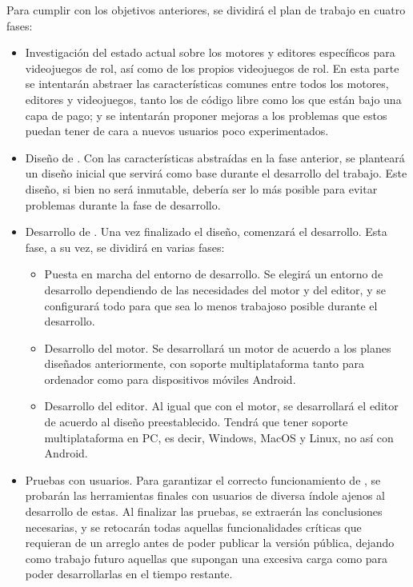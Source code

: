 Para cumplir con los objetivos anteriores, se dividirá el plan de trabajo en cuatro fases:
\begin{itemize}
	\item Investigación del estado actual sobre los motores y editores específicos para videojuegos de rol, así como de los propios videojuegos de rol. En esta parte se intentarán abstraer las características comunes entre todos los motores, editores y videojuegos, tanto los de código libre como los que están bajo una capa de pago; y se intentarán proponer mejoras a los problemas que estos puedan tener de cara a nuevos usuarios poco experimentados.
	\item Diseño de \baker. Con las características abstraídas en la fase anterior, se planteará un diseño inicial que servirá como base durante el desarrollo del trabajo. Este diseño, si bien no será inmutable, debería ser lo más  posible para evitar problemas durante la fase de desarrollo.
	\item Desarrollo de \baker. Una vez finalizado el diseño, comenzará el desarrollo. Esta fase, a su vez, se dividirá en varias fases:
		\begin{itemize}
			\item Puesta en marcha del entorno de desarrollo. Se elegirá un entorno de desarrollo dependiendo de las necesidades del motor y del editor, y se configurará todo para que sea lo menos trabajoso posible durante el desarrollo. 
			\item Desarrollo del motor. Se desarrollará un motor de acuerdo a los planes diseñados anteriormente, con soporte multiplataforma tanto para ordenador como para dispositivos móviles Android.
			\item Desarrollo del editor. Al igual que con el motor, se desarrollará el editor de acuerdo al diseño preestablecido. Tendrá que tener soporte multiplataforma en PC, es decir, Windows, MacOS y Linux, no así con Android.
		\end{itemize}
	\item Pruebas con usuarios. Para garantizar el correcto funcionamiento de \baker, se probarán las herramientas finales con usuarios de diversa índole ajenos al desarrollo de estas. Al finalizar las pruebas, se extraerán las conclusiones necesarias, y se retocarán todas aquellas funcionalidades críticas que requieran de un arreglo antes de poder publicar la versión pública, dejando como trabajo futuro aquellas que supongan una excesiva carga como para poder desarrollarlas en el tiempo restante.
\end{itemize}


